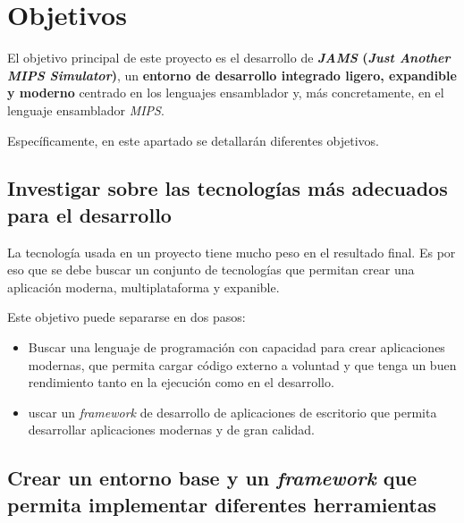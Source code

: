 \section{Objetivos}\label{sec:objetivos}

El objetivo principal de este proyecto es el desarrollo de \textbf{\textit{JAMS}
(\textit{Just Another MIPS Simulator})}, un \textbf{entorno de desarrollo integrado ligero, expandible y moderno}
centrado en los lenguajes ensamblador y, más concretamente, en el lenguaje ensamblador \textit{MIPS}.

Específicamente, en este apartado se detallarán diferentes objetivos.

\subsection{Investigar sobre las tecnologías más adecuados para el desarrollo}
\label{subsec:investigar-sobre-las-tecnologias-mas-adecuados-para-el-desarrollo}

La tecnología usada en un proyecto tiene mucho peso en el resultado final.
Es por eso que se debe buscar un conjunto de tecnologías que permitan crear una aplicación
moderna, multiplataforma y expanible.

Este objetivo puede separarse en dos pasos:
\begin{itemize}
    \item Buscar una lenguaje de programación con capacidad para crear aplicaciones modernas,
    que permita cargar código externo a voluntad y que tenga un buen rendimiento
    tanto en la ejecución como en el desarrollo.
    \item {}uscar un \textit{framework} de desarrollo de aplicaciones de escritorio
    que permita desarrollar aplicaciones modernas y de gran
    calidad.
\end{itemize}

\subsection{Crear un entorno base y un \textit{framework} que permita implementar diferentes herramientas}
\label{subsec:crear-un-entorno-base-y-un-framework-que-permita-implementar-diferentes-herramientas}

